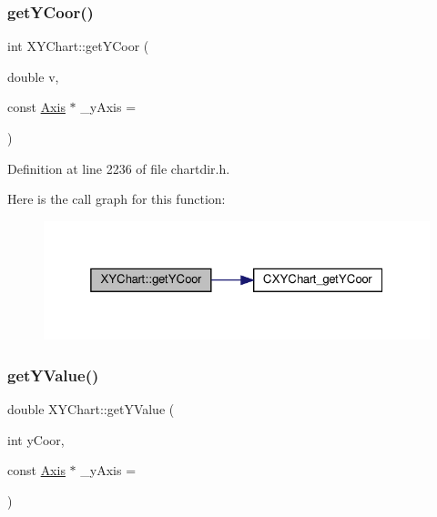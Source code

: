 \subsubsection{\texorpdfstring{get\+Y\+Coor()}{getYCoor()}}
{\footnotesize\ttfamily int X\+Y\+Chart\+::get\+Y\+Coor (\begin{DoxyParamCaption}\item[{double}]{v,  }\item[{const \hyperlink{class_axis}{Axis} $\ast$}]{\+\_\+y\+Axis = {} }\end{DoxyParamCaption})\hspace{0.3cm}{\ttfamily [inline]}}



Definition at line 2236 of file chartdir.\+h.

Here is the call graph for this function\+:
\nopagebreak
\begin{figure}[H]
\begin{center}
\leavevmode
\includegraphics[width=325pt]{class_x_y_chart_a416792e0d3b2a29fcc5c918948581509_cgraph}
\end{center}
\end{figure}
\mbox{\label{class_x_y_chart_af777219a26001a954dce11c9ff737aca}} 
\subsubsection{\texorpdfstring{get\+Y\+Value()}{getYValue()}}
{\footnotesize\ttfamily double X\+Y\+Chart\+::get\+Y\+Value (\begin{DoxyParamCaption}\item[{int}]{y\+Coor,  }\item[{const \hyperlink{class_axis}{Axis} $\ast$}]{\+\_\+y\+Axis = {} }\end{DoxyParamCaption})\hspace{0.3cm}{\ttfamily [inline]}}



